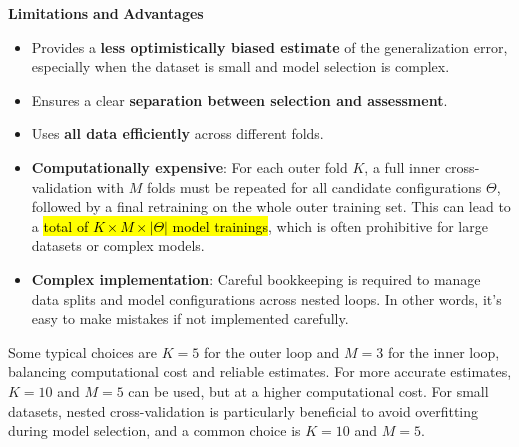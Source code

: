 \begin{flushleft}
    \textcolor{Red2}{ \textbf{Limitations}} \textbf{and} \textcolor{Green3}{ \textbf{Advantages}}
\end{flushleft}
\begin{itemize}
    \item[\textcolor{Green3}{\faIcon{check}}] Provides a \textbf{less optimistically biased estimate} of the generalization error, especially when the dataset is small and model selection is complex.
    \item[\textcolor{Green3}{\faIcon{check}}] Ensures a clear \textbf{separation between selection and assessment}.
    \item[\textcolor{Green3}{\faIcon{check}}] Uses \textbf{all data efficiently} across different folds.
    \item[\textcolor{Red2}{\faIcon{times}}] \textbf{Computationally expensive}: For each outer fold $K$, a full inner cross-validation with $M$ folds must be repeated for all candidate configurations $\Theta$, followed by a final retraining on the whole outer training set. This can lead to a \hl{total of $K \times M \times \left|\Theta\right|$ model trainings}, which is often prohibitive for large datasets or complex models.
    \item[\textcolor{Red2}{\faIcon{times}}] \textbf{Complex implementation}: Careful bookkeeping is required to manage data splits and model configurations across nested loops. In other words, it's easy to make mistakes if not implemented carefully.
\end{itemize}
Some typical choices are $K=5$ for the outer loop and $M=3$ for the inner loop, balancing computational cost and reliable estimates. For more accurate estimates, $K=10$ and $M=5$ can be used, but at a higher computational cost. For small datasets, nested cross-validation is particularly beneficial to avoid overfitting during model selection, and a common choice is $K=10$ and $M=5$.
